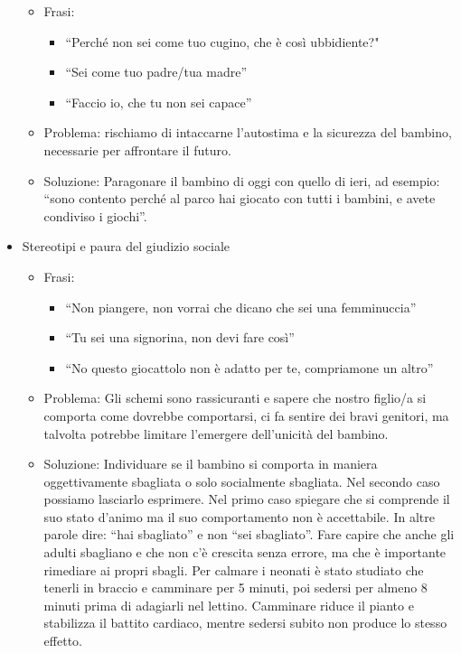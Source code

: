 \documentclass[12pt]{book} %
\begin{document}
\begin{itemize}
\begin{itemize}
\item Frasi:

\begin{itemize}
\item “Perché non sei come tuo cugino, che è così ubbidiente?"
\item “Sei come tuo padre/tua madre”
\item “Faccio io, che tu non sei capace”
\end{itemize}
\item Problema: rischiamo di intaccarne l'autostima e la sicurezza del bambino, necessarie per
affrontare il futuro. 
\item Soluzione: Paragonare il bambino di oggi con quello di ieri, ad esempio: “sono contento perché al parco hai
giocato con tutti i bambini, e avete condiviso i giochi”.
\end{itemize}
\item Stereotipi e paura del giudizio sociale

\begin{itemize}
\item Frasi:

\begin{itemize}
\item “Non piangere, non vorrai che dicano che sei una femminuccia”
\item “Tu sei una signorina, non devi fare così”
\item “No questo giocattolo non è adatto per te, compriamone un altro” 
\end{itemize}
\item Problema: Gli schemi sono rassicuranti e sapere che nostro figlio/a si comporta come dovrebbe comportarsi, ci fa
sentire dei bravi genitori, ma talvolta potrebbe limitare l'emergere dell'unicità del bambino.
\item Soluzione: Individuare se il bambino si comporta in maniera oggettivamente sbagliata o solo socialmente sbagliata.
Nel secondo caso possiamo lasciarlo esprimere. Nel primo caso spiegare che si comprende il suo stato
d'animo ma il suo comportamento non è accettabile. In altre parole dire: “hai sbagliato” e non
“sei sbagliato”. Fare capire che anche gli adulti sbagliano e che non c'è crescita senza errore, ma che è importante
rimediare ai propri sbagli. Per calmare i neonati è stato studiato che tenerli in braccio e camminare per 5 minuti, poi sedersi per almeno 8 minuti prima di adagiarli nel lettino. Camminare riduce il pianto e stabilizza il battito cardiaco, mentre sedersi subito non produce lo stesso effetto.
\end{itemize}
\end{itemize}
\end{document}
